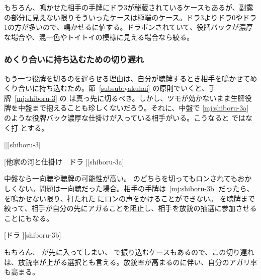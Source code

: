 \documentclass[../nankiru_main.tex]{subfiles}
\renewcommand{\renderOption}{0}
\begin{document}
\begin{rittai}[h]
  \centering  {}
  \caption{クソ配牌をもらい、七対子や役牌を見つつ中盤に入ったら他家に鳴かせる進行になる。}
  \label{rittai:shiboru-2}
\end{rittai}

もちろん、鳴かせた相手の手牌にドラ3が秘蔵されているケースもあるが、副露の部分に見えない限りそういったケースは極端のケース。ドラ3よりドラ0やドラ1の方が多いので、鳴かせるに値する。ドラポンされていて、役牌バックが濃厚な場合や、混一色やトイトイの模様に見える場合なら絞る。


\subsubsection*{めくり合いに持ち込むための切り遅れ}

もう一つ役牌を切るのを遅らせる理由は、自分が聴牌するとき相手を鳴かせてめくり合いに持ち込むため\citep[][p.~19]{zero-teyaku}。節~\ref{subsub:yakuhai} の原則でいくと、手牌~\ref{mj:shiboru-3} の  は真っ先に切るべき。しかし、ツモが効かないまま生牌役牌を中盤まで抱えることも珍しくないだろう。それに、中盤で \ref{mj:shiboru-3a} のような役牌バック濃厚な仕掛けが入っている相手がいる。こうなると  ではなく打  とする。

[][shiboru-3]

[他家の河と仕掛け　ドラ ][shiboru-3a]

中盤なら一向聴や聴牌の可能性が高い。 のどちらを切ってもロンされてもおかしくない。問題は一向聴だった場合。相手の手牌は~\ref{mj:shiboru-3b} だったら、 を鳴かせない限り、打たれた  にロンの声をかけることができない。 を聴牌まで絞って、相手が自分の先にアガることを阻止し、相手を放銃の抽選に参加させることにもなる。

[ドラ ][shiboru-3b]

もちろん、 が先に入ってしまい、 で振り込むケースもあるので、この切り遅れは、放銃率が上がる選択とも言える。放銃率が高まるのに伴い、自分のアガリ率も高まる。


\renewcommand{\renderOption}{0}
\end{document}
